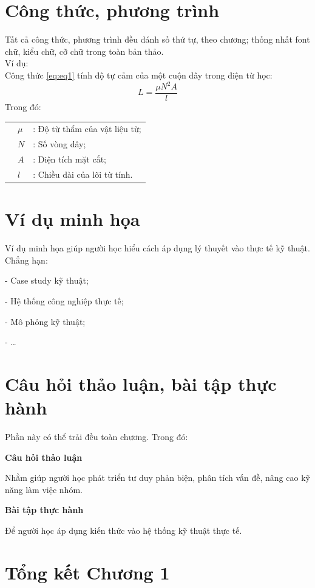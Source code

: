 \section{Công thức, phương trình}
Tất cả công thức, phương trình đều đánh số thứ tự, theo chương; thống nhất font chữ, kiểu chữ, cỡ chữ trong toàn bản thảo.\\
Ví dụ:\\
Công thức \ref{eq:eq1} tính độ tự cảm của một cuộn dây trong điện từ học:
\begin{equation}
	L=\frac{\mu N^2 A}{l}
	\label{eq:eq1}
\end{equation}
Trong đó:\\
\begin{tabular}{p{0.5 cm}ll}
	& $\mu$ &: Độ từ thẩm của vật liệu từ;\\
	& $N$ &: Số vòng dây;\\
	& $A$ &: Diện tích mặt cắt;\\
	& $l$ &: Chiều dài của lõi từ tính.\\
\end{tabular}
\section{Ví dụ minh họa}
Ví dụ minh họa giúp người học hiểu cách áp dụng lý thuyết vào thực tế kỹ thuật. Chẳng hạn:

- Case study kỹ thuật;

- Hệ thống công nghiệp thực tế;

- Mô phỏng kỹ thuật;

- …

\section{Câu hỏi thảo luận, bài tập thực hành}

Phần này có thể trải đều toàn chương. Trong đó:

\noindent\textbf{Câu hỏi thảo luận}

\noindent Nhằm giúp người học phát triển tư duy phản biện, phân tích vấn đề, nâng cao kỹ năng làm việc nhóm.

\noindent\textbf{Bài tập thực hành}

\noindent Để người học áp dụng kiến thức vào hệ thống kỹ thuật thực tế.

\section{Tổng kết Chương 1}

